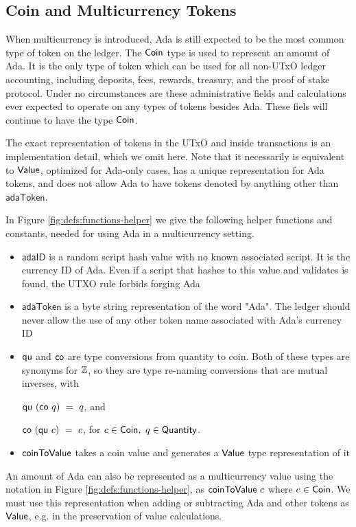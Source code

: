 \subsection*{Coin and Multicurrency Tokens}
When multicurrency is introduced, Ada is still expected to be
the most common type of token on the ledger.
The $\mathsf{Coin}$ type is used to represent an amount of Ada.
It is the only
type of token which can be used for all non-UTxO ledger accounting, including deposits,
fees, rewards, treasury, and the proof of stake protocol. Under no circumstances
are these administrative fields and calculations ever expected to operate on
any types of tokens besides Ada. These fiels will continue to have the type $\mathsf{Coin}$.

The exact representation of tokens in the UTxO and inside transactions
is an implementation detail, which we omit here.
Note that it necessarily is equivalent to $\mathsf{Value}$, optimized
for Ada-only cases, has a unique representation for Ada tokens,
and does not allow Ada to have tokens denoted by anything other than $\mathsf{adaToken}$.

In Figure \ref{fig:defs:functions-helper} we give the following helper functions
and constants, needed for using Ada in a multicurrency setting.

\begin{itemize}
  \item $\mathsf{adaID}$ is a random script hash value with no known associated
  script. It is the currency ID of Ada. Even if a
  script that hashes to this value
  and validates is found, the UTXO rule forbids forging Ada
  \item $\mathsf{adaToken}$ is a byte string representation of the word "Ada".
  The ledger should never allow the use of any other token name associated
  with Ada's currency ID
  \item $\mathsf{qu}$ and $\mathsf{co}$ are type conversions from quantity to
  coin. Both of these types are synonyms for $\mathbb{Z}$, so they are
  type re-naming conversions that are mutual inverses, with

  $\mathsf{qu} ~(\mathsf{co} ~q )~= ~q$, and

  $\mathsf{co}~ (\mathsf{qu}~ c) ~=~ c$, for $c \in \mathsf{Coin},~q \in \mathsf{Quantity}$.

  \item $\mathsf{coinToValue}$ takes a coin value and generates a $\mathsf{Value}$ type representation
  of it
\end{itemize}

An amount of Ada can also be represented as a multicurrency value
using the notation in Figure \ref{fig:defs:functions-helper}, as
$\mathsf{coinToValue}~c$ where $c \in \mathsf{Coin}$. We must use this representation
when adding or subtracting Ada and other tokens as $\mathsf{Value}$, e.g. in the
preservation of value calculations.


